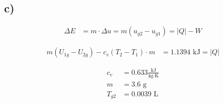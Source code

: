 

\subsection*{c)}

\begin{align*}
\Delta E &= m \cdot \Delta u = m (u_{g2} - u_{g1}) = |Q| - W
\end{align*}

\begin{align*}
m (U_{1g} - U_{2g}) - c_v (T_2 - T_1) \cdot m &= 1.1394 \text{ kJ} = |Q|
\end{align*}

\begin{align*}
c_v &= 0.633 \frac{\text{kJ}}{\text{kg} \cdot \text{K}} \\
m &= 3.6 \text{ g} \\
T_{g2} &= 0.0039 \text{ L}
\end{align*}